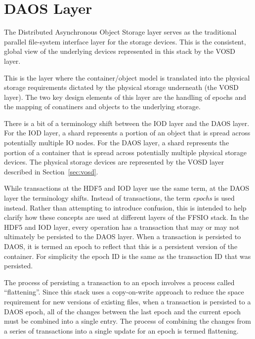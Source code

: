 \documentclass[conference]{IEEEtran}
\begin{document}
\section{DAOS Layer}
\label{sec:daos}

The Distributed Asynchronous Object Storage layer serves as the traditional
parallel file-system interface layer for the storage devices. This is the
consistent, global view of the underlying devices represented in this stack
by the VOSD layer.

This is the layer where the container/object model is translated into the
physical storage requirements dictated by the physical storage underneath (the
VOSD layer). The two key design elements of this layer are the handling of
epochs and the mapping of conatiners and objects to the underlying storage.

There is a bit of a terminology shift between the IOD layer and the DAOS
layer. For the IOD layer, a shard represents a portion of an object that is
spread across potentially multiple IO nodes. For the DAOS layer, a shard
represents the portion of a container that is spread across potentially
multiple physical storage devices. The physical storage devices are represented
by the VOSD layer described in Section~\ref{sec:vosd}.

While transactions at the HDF5 and IOD layer use the same term, at the DAOS
layer the terminology shifts. Instead of transactions, the term {\em epochs}
is used instead. Rather than attempting to introduce confusion, this is intended
to help clarify how these concepts are used at different layers of the FFSIO
stack. In the HDF5 and IOD layer, every operation has a transaction that may
or may not ultimately be persisted to the DAOS layer. When a transaction is
persisted to DAOS, it is termed an epoch to reflect that this is a persistent
version of the container. For simplicity the epoch ID is the same as the
transaction ID that was persisted.

The process of persisting a transaction to an epoch involves a process called
``flattening''. Since this stack uses a copy-on-write approach to reduce the
space requirement for new versions of existing files, when a transaction is
persisted to a DAOS epoch, all of the changes between the last epoch and the
current epoch must be combined into a single entry. The process of combining
the changes from a series of transactions into a single update for an epoch
is termed flattening.

\end{document}

